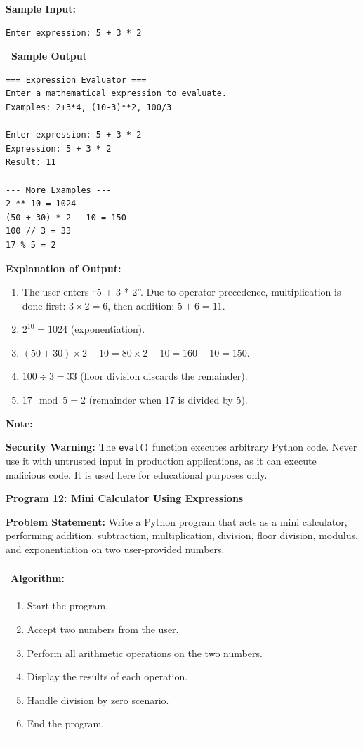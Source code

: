 \documentclass[12pt,a4paper]{article}
\makeatletter
\newcommand{\outhead}{\noindent\colorbox{cmrgreen!25}%
  {\textbf{\small\color{cmrdark}~Sample Output~}}\par\vspace{-1pt}}
\newenvironment{notebox}{%
  \par\vspace{4pt}%
  \noindent\textbf{Note:}\par\vspace{2pt}%
  \begin{minipage}{\linewidth}%
  \small%
}{%
  \end{minipage}\par\vspace{4pt}%
}
\newenvironment{algobox}{%
  \par\vspace{4pt}%
  \noindent\begin{tabular}{@{}p{\linewidth}@{}}%
  \hline\\[-8pt]%
  \textbf{\color{blue!60!black}\small Algorithm:}\\[2pt]%
}{%
  \\[-4pt]\hline%
  \end{tabular}\par\vspace{4pt}%
}
\makeatother
\begin{document}
\textbf{Sample Input:}
\begin{verbatim}
Enter expression: 5 + 3 * 2
\end{verbatim}

\outhead
\begin{lstlisting}[style=outputstyle]
=== Expression Evaluator ===
Enter a mathematical expression to evaluate.
Examples: 2+3*4, (10-3)**2, 100/3

Enter expression: 5 + 3 * 2
Expression: 5 + 3 * 2
Result: 11

--- More Examples ---
2 ** 10 = 1024
(50 + 30) * 2 - 10 = 150
100 // 3 = 33
17 % 5 = 2
\end{lstlisting}

\textbf{Explanation of Output:}
\begin{enumerate}
  \item The user enters ``5 + 3 * 2''. Due to operator precedence, multiplication is done first: $3 \times 2 = 6$, then addition: $5 + 6 = 11$.
  \item $2^{10} = 1024$ (exponentiation).
  \item $(50 + 30) \times 2 - 10 = 80 \times 2 - 10 = 160 - 10 = 150$.
  \item $100 \div 3 = 33$ (floor division discards the remainder).
  \item $17 \mod 5 = 2$ (remainder when 17 is divided by 5).
\end{enumerate}

\begin{notebox}
\textbf{Security Warning:} The \texttt{eval()} function executes arbitrary Python code. Never use it with untrusted input in production applications, as it can execute malicious code. It is used here for educational purposes only.
\end{notebox}

\vspace{0.5cm}

\textbf{Program 12: Mini Calculator Using Expressions}

\textbf{Problem Statement:}
Write a Python program that acts as a mini calculator, performing addition, subtraction, multiplication, division, floor division, modulus, and exponentiation on two user-provided numbers.

\begin{algobox}
\begin{enumerate}[label=Step \arabic*:]
  \item Start the program.
  \item Accept two numbers from the user.
  \item Perform all arithmetic operations on the two numbers.
  \item Display the results of each operation.
  \item Handle division by zero scenario.
  \item End the program.
\end{enumerate}
\end{algobox}
\end{document}
